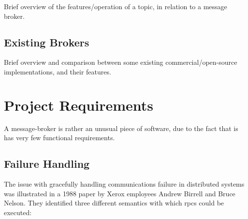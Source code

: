 Brief overview of the features/operation of a topic, in relation to a message broker.

\subsection{Existing Brokers}
\label{sub:Existing Brokers}

Brief overview and comparison between some existing commercial/open-source
implementations, and their features.


\section{Project Requirements}
\label{sec:SLA/QoS Specification}

A message-broker is rather an unusual piece of software, due to the fact that is has very few functional requirements.

\subsection{Failure Handling}
\label{sub:Failure Handling}

The issue with gracefully handling communications failure in distributed systems
was illustrated in a 1988 paper by Xerox employees
Andrew Birrell and Bruce Nelson\cite{Birrell:1988:IRP:59309.59336}. They identified
three different semantics with which \glspl{rpc} could be executed:

